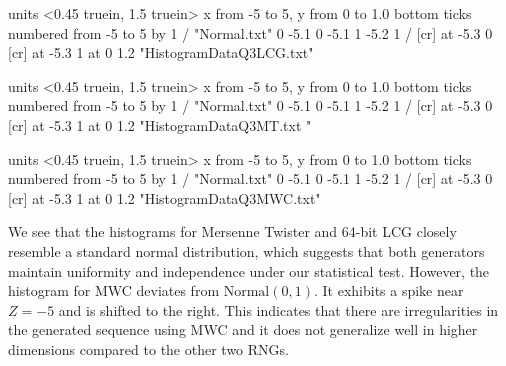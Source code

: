 \documentclass{article}
\begin{document}
\begin{center}
\maketitle
\beginpicture
\setcoordinatesystem units <0.45 truein, 1.5 truein>
\setplotarea x from -5 to 5, y from  0 to 1.0
\axis bottom
ticks numbered from -5 to 5 by 1
/
\plot "Normal.txt"
 0 -5.1 0 -5.1 1  -5.2 1 /
 [cr] at -5.3 0
 [cr] at -5.3 1
 at 0 1.2
\sethistograms
\plot "HistogramDataQ3LCG.txt"
\endpicture
\end{center}

\begin{center}
\maketitle
\beginpicture
\setcoordinatesystem units <0.45 truein, 1.5 truein>
\setplotarea x from -5 to 5, y from  0 to 1.0
\axis bottom
ticks numbered from -5 to 5 by 1
/
\plot "Normal.txt"
 0 -5.1 0 -5.1 1  -5.2 1 /
 [cr] at -5.3 0
 [cr] at -5.3 1
 at 0 1.2
\sethistograms
\plot "HistogramDataQ3MT.txt
"
\endpicture
\end{center}

\begin{center}
\maketitle
\beginpicture
\setcoordinatesystem units <0.45 truein, 1.5 truein>
\setplotarea x from -5 to 5, y from  0 to 1.0
\axis bottom
ticks numbered from -5 to 5 by 1
/
\plot "Normal.txt"
 0 -5.1 0 -5.1 1  -5.2 1 /
 [cr] at -5.3 0
 [cr] at -5.3 1
 at 0 1.2
\sethistograms
\plot "HistogramDataQ3MWC.txt"
\endpicture
\end{center}

We see that the histograms for Mersenne Twister and 64-bit LCG closely resemble a standard normal distribution, which suggests that both generators maintain uniformity and independence under our statistical test. However, the histogram for MWC deviates from \(\text{Normal}(0, 1)\). It exhibits a spike near \(Z = -5\) and is shifted to the right. This indicates that there are irregularities in the generated sequence using MWC and it does not generalize well in higher dimensions compared to the other two RNGs.
\end{document}
